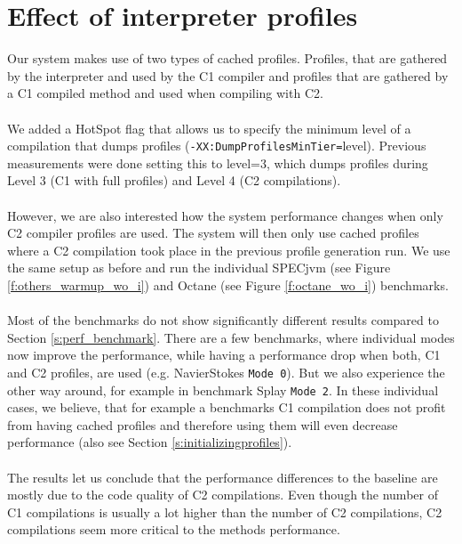 \section{Effect of interpreter profiles}
\label{s:perf_interpreter_profiles}
Our system makes use of two types of cached profiles. Profiles, that are gathered by the interpreter and used by the C1 compiler and profiles that are gathered by a C1 compiled method and used when compiling with C2.
\\\\
We added a HotSpot flag that allows us to specify the minimum level of a compilation that dumps profiles (\texttt{-XX:DumpProfilesMinTier=}level).
Previous measurements were done setting this to level=3, which dumps profiles during Level 3 (C1 with full profiles) and Level 4 (C2 compilations).
\\\\
However, we are also interested how the system performance changes when only C2 compiler profiles are used. The system will then only use cached profiles where a C2 compilation took place in the previous profile generation run. We use the same setup as before and run the individual SPECjvm (see Figure \ref{f:others_warmup_wo_i}) and Octane (see Figure \ref{f:octane_wo_i}) benchmarks. 
\\\\
Most of the benchmarks do not show significantly different results compared to Section \ref{s:perf_benchmark}. There are a few benchmarks, where individual modes now improve the performance, while having a performance drop when both, C1 and C2 profiles, are used (e.g. NavierStokes \texttt{Mode 0}). But we also experience the other way around, for example in benchmark Splay \texttt{Mode 2}. In these individual cases, we believe, that for example a benchmarks C1 compilation does not profit from having cached profiles and therefore using them will even decrease performance (also see Section \ref{s:initializingprofiles}).
\\\\
The results let us conclude that the performance differences to the baseline are mostly due to the code quality of C2 compilations. Even though the number of C1 compilations is usually a lot higher than the number of C2 compilations, C2 compilations seem more critical to the methods performance.
